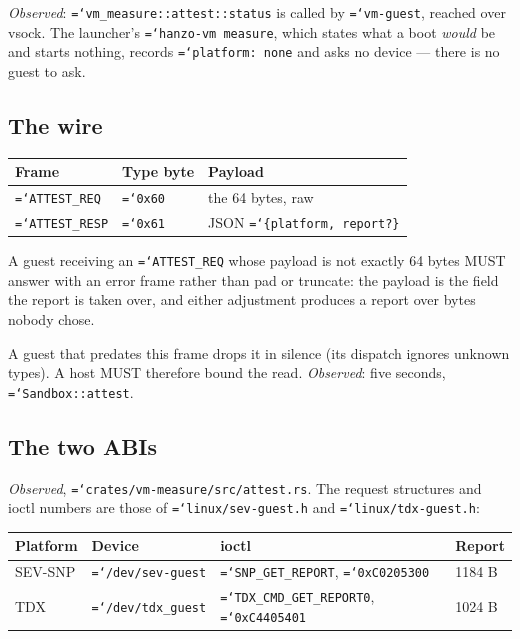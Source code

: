 \documentclass[11pt,a4paper]{article}
\newcommand{\code}[1]{\texttt{\hyphenchar\font=`\-\relax #1}}
\begin{document}
\emph{Observed}: \code{vm\_measure::attest::status} is called by \code{vm-guest},
reached over vsock. The launcher's \code{hanzo-vm measure}, which states what a
boot \emph{would} be and starts nothing, records \code{platform: none} and asks no
device --- there is no guest to ask.

\subsection{The wire}

\begin{center}
\begin{tabular}{@{}lll@{}}
\toprule
Frame & Type byte & Payload \\
\midrule
\code{ATTEST\_REQ}  & \code{0x60} & the 64 bytes, raw \\
\code{ATTEST\_RESP} & \code{0x61} & JSON \code{\{platform, report?\}} \\
\bottomrule
\end{tabular}
\end{center}

A guest receiving an \code{ATTEST\_REQ} whose payload is not exactly 64 bytes MUST
answer with an error frame rather than pad or truncate: the payload is the field
the report is taken over, and either adjustment produces a report over bytes
nobody chose.

A guest that predates this frame drops it in silence (its dispatch ignores unknown
types). A host MUST therefore bound the read. \emph{Observed}: five seconds,
\code{Sandbox::attest}.

\subsection{The two ABIs}

\emph{Observed}, \code{crates/vm-measure/src/attest.rs}. The request structures and
ioctl numbers are those of \code{linux/sev-guest.h} and \code{linux/tdx-guest.h}:

\begin{center}
\begin{tabular}{@{}llll@{}}
\toprule
Platform & Device & ioctl & Report \\
\midrule
SEV-SNP & \code{/dev/sev-guest}  & \code{SNP\_GET\_REPORT}, \code{0xC0205300}     & 1184 B \\
TDX     & \code{/dev/tdx\_guest} & \code{TDX\_CMD\_GET\_REPORT0}, \code{0xC4405401} & 1024 B \\
\bottomrule
\end{tabular}
\end{center}
\end{document}
